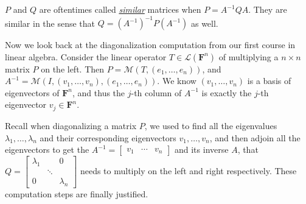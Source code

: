 \documentclass{article}
\newcommand{\df}[1]{\ul{\textit{#1}}}
\newcommand{\F}{\mathbf{F}}
\newcommand{\M}{\mathcal{M}}
\begin{document}
    $P$ and $Q$ are oftentimes called \df{similar} matrices when $P = A^{-1} Q A$. They are similar in the sense that $Q = (A^{-1})^{-1} P (A^{-1})$ as well.

    Now we look back at the diagonalization computation from our first course in linear algebra. Consider the linear operator $T \in \mathcal{L}(\F^n)$ of multiplying a $n\times n$ matrix $P$ on the left. Then $P = \M(T,(e_1,\dots,e_n))$, and $A^{-1} = \M(I,(v_1,\dots,v_n),(e_1,\dots,e_n))$. We know $(v_1,\dots,v_n)$ is a basis of eigenvectors of $\F^n$, and thus the $j$-th column of $A^{-1}$ is exactly the $j$-th eigenvector $v_j \in \F^n$.
    
    Recall when diagonalizing a matrix $P$, we used to find all the eigenvalues $\lambda_1,\dots,\lambda_n$ and their corresponding eigenvectors $v_1,\dots,v_n$, and then adjoin all the eigenvectors to get the $A^{-1} = \begin{bmatrix} v_1 & \cdots & v_n \end{bmatrix}$ and its inverse $A$, that $Q = \begin{bmatrix}
    \lambda_1 & & 0 \\
    & \ddots & \\
    0 & & \lambda_n
    \end{bmatrix}$ needs to multiply on the left and right respectively. These computation steps are finally justified.
\end{document}
